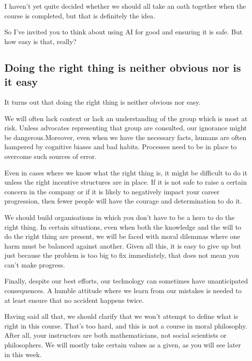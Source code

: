 \documentclass[
]{book}
\theoremstyle{definition}
\theoremstyle{definition}
\theoremstyle{definition}
\theoremstyle{definition}
\theoremstyle{remark}
\begin{document}
I haven't yet quite decided whether we should all take an oath together when the course is completed, but that is definitely the idea.

So I've invited you to think about using AI for good and ensuring it is safe. But how easy is that, really?

\hypertarget{doing-the-right-thing-is-neither-obvious-nor-is-it-easy}{%
\subsection{Doing the right thing is neither obvious nor is it easy}\label{doing-the-right-thing-is-neither-obvious-nor-is-it-easy}}

It turns out that doing the right thing is neither obvious nor easy.

We will often lack context or lack an understanding of the group which is most at risk. Unless advocates representing that group are consulted, our ignorance might be dangerous.Moreover, even when we have the necessary facts, humans are often hampered by cognitive biases and bad habits. Processes need to be in place to overcome such sources of error.

Even in cases where we know what the right thing is, it might be difficult to do it unless the right incentive structures are in place. If it is not safe to raise a certain concern in the company or if it is likely to negatively impact your career progression, then fewer people will have the courage and determination to do it.

We should build organisations in which you don't have to be a hero to do the right thing. In certain situations, even when both the knowledge and the will to do the right thing are present, we will be faced with moral dilemmas where one harm must be balanced against another. Given all this, it is easy to give up but just because the problem is too big to fix immediately, that does not mean you can't make progress.

Finally, despite our best efforts, our technology can sometimes have unanticipated consequences. A humble attitude where we learn from our mistakes is needed to at least ensure that no accident happens twice.

Having said all that, we should clarify that we won't attempt to define what is right in this course. That's too hard, and this is not a course in moral philosophy. After all, your instructors are both mathematicians, not social scientists or philosophers. We will mostly take certain values as a given, as you will see later in this week.
\end{document}

